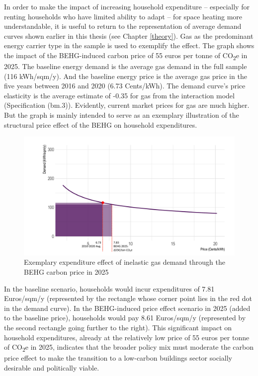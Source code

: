 \documentclass[12pt,twoside]{reedthesis}
\begin{document}
In order to make the impact of increasing household expenditure -- especially for renting households who have limited ability to adapt -- for space heating more understandable, it is useful to return to the representation of average demand curves shown earlier in this thesis (see Chapter \ref{theory}). Gas as the predominant energy carrier type in the sample is used to exemplify the effect. The graph shows the impact of the BEHG-induced carbon price of 55 euros per tonne of CO\textsubscript{2}e in 2025. The baseline energy demand is the average gas demand in the full sample (116 kWh/sqm/y). And the baseline energy price is the average gas price in the five years between 2016 and 2020 (6.73 Cents/kWh). The demand curve's price elasticity is the average estimate of -0.35 for gas from the interaction model (Specification (bm.3)). Evidently, current market prices for gas are much higher. But the graph is mainly intended to serve as an exemplary illustration of the structural price effect of the BEHG on household expenditures.
\begin{figure}

{\centering \includegraphics[width=1\linewidth]{figure/budget_effect_gas_example} 

}

\caption{Exemplary expenditure effect of inelastic gas demand through the BEHG carbon price in 2025}\label{fig:budget-effect}
\end{figure}
In the baseline scenario, households would incur expenditures of 7.81 Euros/sqm/y (represented by the rectangle whose corner point lies in the red dot in the demand curve). In the BEHG-induced price effect scenario in 2025 (added to the baseline price), households would pay 8.61 Euros/sqm/y (represented by the second rectangle going further to the right). This significant impact on household expenditures, already at the relatively low price of 55 euros per tonne of CO\textsubscript{2}e in 2025, indicates that the broader policy mix must moderate the carbon price effect to make the transition to a low-carbon buildings sector socially desirable and politically viable.
\end{document}
